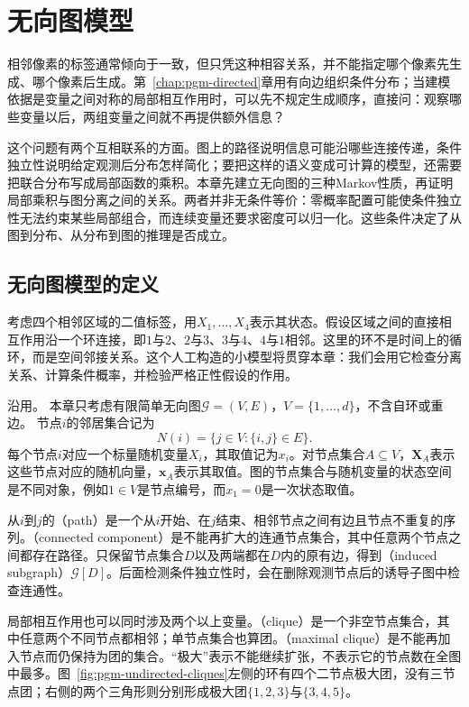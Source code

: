 \chapter{无向图模型}
\label{chap:pgm-undirected}

相邻像素的标签通常倾向于一致，但只凭这种相容关系，并不能指定哪个像素先生成、哪个像素后生成。第~\ref{chap:pgm-directed}章用有向边组织条件分布；当建模依据是变量之间对称的局部相互作用时，可以先不规定生成顺序，直接问：观察哪些变量以后，两组变量之间就不再提供额外信息？

这个问题有两个互相联系的方面。图上的路径说明信息可能沿哪些连接传递，条件独立性说明给定观测后分布怎样简化；要把这样的语义变成可计算的模型，还需要把联合分布写成局部函数的乘积。本章先建立无向图的三种Markov性质，再证明局部乘积与图分离之间的关系。两者并非无条件等价：零概率配置可能使条件独立性无法约束某些局部组合，而连续变量还要求密度可以归一化。这些条件决定了从图到分布、从分布到图的推理是否成立。

\section{无向图模型的定义}
\label{sec:pgm-undirected-definition}

考虑四个相邻区域的二值标签，用$X_1,\ldots,X_4$表示其状态。假设区域之间的直接相互作用沿一个环连接，即$1$与$2$、$2$与$3$、$3$与$4$、$4$与$1$相邻。这里的环不是时间上的循环，而是空间邻接关系。这个人工构造的小模型将贯穿本章：我们会用它检查分离关系、计算条件概率，并检验严格正性假设的作用。

沿用。
本章只考虑有限简单无向图$\mathcal G=(V,E)$，$V=\{1,\ldots,d\}$，不含自环或重边。
节点$i$的邻居集合记为
\[
  N(i)=\{j\in V:\{i,j\}\in E\}.
\]
每个节点$i$对应一个标量随机变量$X_i$，其取值记为$x_i$。对节点集合$A\subseteq V$，$\bm{X}_A$表示这些节点对应的随机向量，$\bm{x}_A$表示其取值。图的节点集合与随机变量的状态空间是不同对象，例如$1\in V$是节点编号，而$x_1=0$是一次状态取值。

从$i$到$j$的（path）是一个从$i$开始、在$j$结束、相邻节点之间有边且节点不重复的序列。（connected component）是不能再扩大的连通节点集合，其中任意两个节点之间都存在路径。只保留节点集合$D$以及两端都在$D$内的原有边，得到（induced subgraph）$\mathcal{G}[D]$。后面检测条件独立性时，会在删除观测节点后的诱导子图中检查连通性。

局部相互作用也可以同时涉及两个以上变量。（clique）是一个非空节点集合，其中任意两个不同节点都相邻；单节点集合也算团。（maximal clique）是不能再加入节点而仍保持为团的集合。“极大”表示不能继续扩张，不表示它的节点数在全图中最多。图~\ref{fig:pgm-undirected-cliques}左侧的环有四个二节点极大团，没有三节点团；右侧的两个三角形则分别形成极大团$\{1,2,3\}$与$\{3,4,5\}$。

